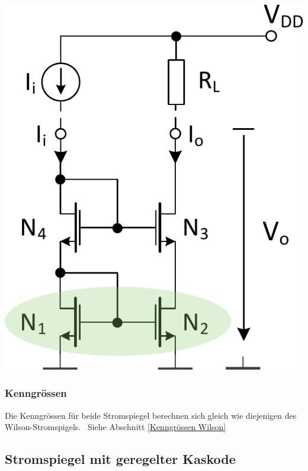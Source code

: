 \begin{minipage}[t]{0.35\columnwidth}
    \begin{center}
        \textbf{}

        \includegraphics[width=\columnwidth, align=t]{images/06_stormspiegel_kaskode.pdf}
    \end{center}
\end{minipage}


\subsubsection{Kenngrössen}

Die Kenngrössen für beide Stromspiegel berechnen sich gleich wie diejenigen des Wilson-Stromspigels.
\textrightarrow\ Siehe Abschnitt \ref{Kenngrössen Wilson}

\columnbreak


\subsection{Stromspiegel mit geregelter Kaskode}

